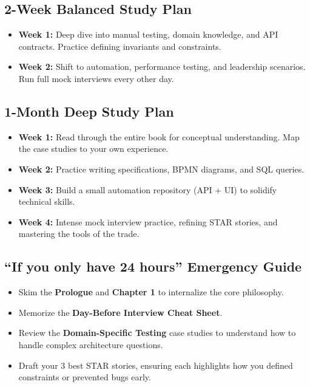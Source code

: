 \documentclass[
  11pt,
  openany,
  oneside]{book}
\providecommand{\tightlist}{%
  \setlength{\itemsep}{0pt}\setlength{\parskip}{0pt}}
\begin{document}
\subsection{2-Week Balanced Study Plan}\label{week-balanced-study-plan}

\begin{itemize}
\tightlist
\item
  \textbf{Week 1:} Deep dive into manual testing, domain knowledge, and
  API contracts. Practice defining invariants and constraints.
\item
  \textbf{Week 2:} Shift to automation, performance testing, and
  leadership scenarios. Run full mock interviews every other day.
\end{itemize}

\subsection{1-Month Deep Study Plan}\label{month-deep-study-plan}

\begin{itemize}
\tightlist
\item
  \textbf{Week 1:} Read through the entire book for conceptual
  understanding. Map the case studies to your own experience.
\item
  \textbf{Week 2:} Practice writing specifications, BPMN diagrams, and
  SQL queries.
\item
  \textbf{Week 3:} Build a small automation repository (API + UI) to
  solidify technical skills.
\item
  \textbf{Week 4:} Intense mock interview practice, refining STAR
  stories, and mastering the tools of the trade.
\end{itemize}

\subsection{``If you only have 24 hours'' Emergency
Guide}\label{if-you-only-have-24-hours-emergency-guide}

\begin{itemize}
\tightlist
\item
  Skim the \textbf{Prologue} and \textbf{Chapter 1} to internalize the
  core philosophy.
\item
  Memorize the \textbf{Day-Before Interview Cheat Sheet}.
\item
  Review the \textbf{Domain-Specific Testing} case studies to understand
  how to handle complex architecture questions.
\item
  Draft your 3 best STAR stories, ensuring each highlights how you
  defined constraints or prevented bugs early.
\end{itemize}
\end{document}

